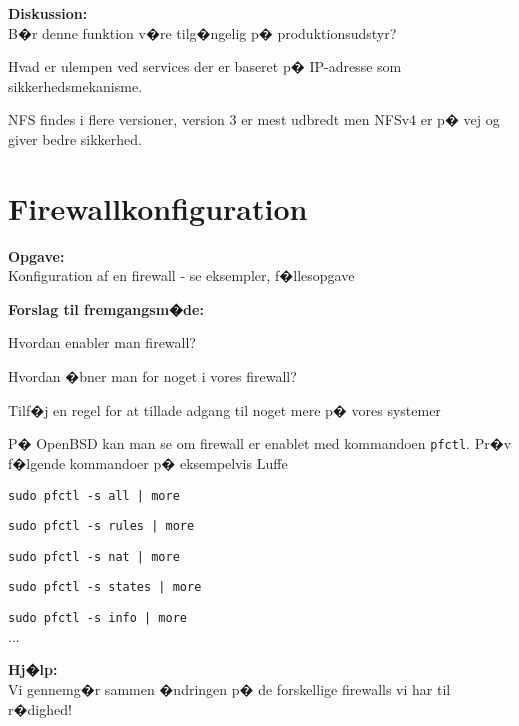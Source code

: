 \documentclass[a4paper,11pt,notitlepage]{oevelser}
\begin{document}
{\bfseries Diskussion:}\\
B�r denne funktion v�re tilg�ngelig p� produktionsudstyr?

Hvad er ulempen ved services der er baseret p� IP-adresse som sikkerhedsmekanisme.

NFS findes i flere versioner, version 3 er mest udbredt men NFSv4 er p� vej og giver
bedre sikkerhed.




\chapter{Firewallkonfiguration}
\label{ex:unix-basic-firewall}

{\bfseries Opgave:}\\
Konfiguration af en firewall - se eksempler, f�llesopgave

{\bfseries Forslag til fremgangsm�de:}\\
\begin{list2}
\item Hvordan enabler man firewall?
\item Hvordan �bner man for noget i vores firewall?
\item Tilf�j en regel for at tillade adgang til noget mere p� vores
  systemer
\end{list2}

P� OpenBSD kan man se om firewall er enablet med kommandoen \verb+pfctl+. Pr�v f�lgende kommandoer p� eksempelvis Luffe
\begin{list2}
\item \verb+sudo pfctl -s all | more+
\item \verb+sudo pfctl -s rules | more+
\item \verb+sudo pfctl -s nat | more+
\item \verb+sudo pfctl -s states | more+
\item \verb+sudo pfctl -s info | more+\\
...
\end{list2}



{\bfseries Hj�lp:}\\
Vi gennemg�r sammen �ndringen p� de forskellige firewalls vi har til
r�dighed!


\end{document}
